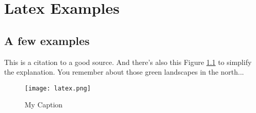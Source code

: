 \chapter{Latex Examples}

\section{A few examples}

This is a citation \cite{reference_name_3} to a good source. And there's also this Figure \ref{alabel} to simplify the explanation. You remember about those {\color{mygreen} green} landscapes in the north...

\begin{figure}[H]
    \centering
    \texttt{[image: latex.png]}
    \caption{My Caption}
    \label{alabel}
\end{figure}
